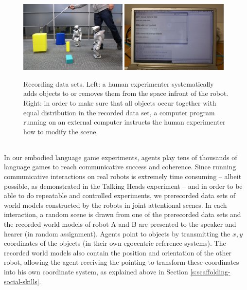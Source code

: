 \begin{figure}[t]
  \includegraphics[width=0.48\textwidth]{figures/data-sets-recording-moving-objects}%
  \hspace{0.04\textwidth}%
  \includegraphics[width=0.48\textwidth]{figures/data-sets-recording-screen}
  \caption{Recording data sets. Left: a human experimenter
    systematically adds objects to or removes them from the space
    infront of the robot. Right: in order to make sure that all objects
    occur together with equal distribution in the recorded data set, a
    computer program running on an external computer instructs the human
    experimenter how to modify the scene.}
  \label{f:recording-data-sets}
\end{figure}

~\\

In our embodied language game experiments, agents play tens of
thousands of language games to reach communicative success and
coherence. Since running communicative interactions on real robots is
extremely time consuming -- albeit possible, as demonstrated in the
Talking Heads experiment \citep{steels99situated} -- and in order to
be able to do repeatable and controlled experiments, we prerecorded
data sets of world models constructed by the robots in joint
attentional scenes.  In each interaction, a random scene is drawn from
one of the prerecorded data sets and the recorded world models of
robot A and B are presented to the speaker and hearer (in random
assignment). Agents point to objects by transmitting the $x,y$
coordinates of the objects (in their own egocentric reference
systems). The recorded world models also contain the position and
orientation of the other robot, allowing the agent receiving the
pointing to transform these coordinates into his own coordinate
system, as explained above in Section
\ref{s:scaffolding-social-skills}.


